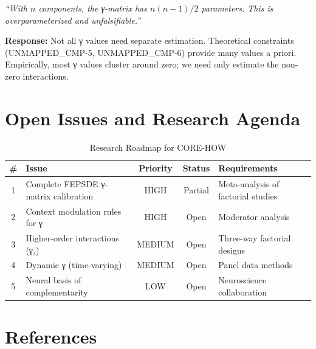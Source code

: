 \begin{tcolorbox}[colback=red!5!white, colframe=red!50!black,
    title=Objection: Too Many Parameters]
\textit{``With $n$ components, the γ-matrix has $n(n-1)/2$ parameters.
This is overparameterized and unfalsifiable.''}
\end{tcolorbox}

\textbf{Response:}
Not all γ values need separate estimation. Theoretical constraints (UNMAPPED_CMP-5, UNMAPPED_CMP-6)
provide many values a priori. Empirically, most γ values cluster around zero;
we need only estimate the non-zero interactions.


\section{Open Issues and Research Agenda}
\label{sec:how-open}

\begin{table}[htbp]
\centering
\caption{Research Roadmap for CORE-HOW}
\label{tab:how-roadmap}
\renewcommand{\arraystretch}{1.3}
\begin{tabular}{@{}clccl@{}}
\toprule
\textbf{\#} & \textbf{Issue} & \textbf{Priority} & \textbf{Status} & \textbf{Requirements} \\
\midrule
1 & Complete FEPSDE γ-matrix calibration & HIGH & Partial & Meta-analysis of factorial studies \\
2 & Context modulation rules for γ & HIGH & Open & Moderator analysis \\
3 & Higher-order interactions (γ₃) & MEDIUM & Open & Three-way factorial designs \\
4 & Dynamic γ (time-varying) & MEDIUM & Open & Panel data methods \\
5 & Neural basis of complementarity & LOW & Open & Neuroscience collaboration \\
\bottomrule
\end{tabular}
\end{table}


\section{References}
\label{sec:how-references}

